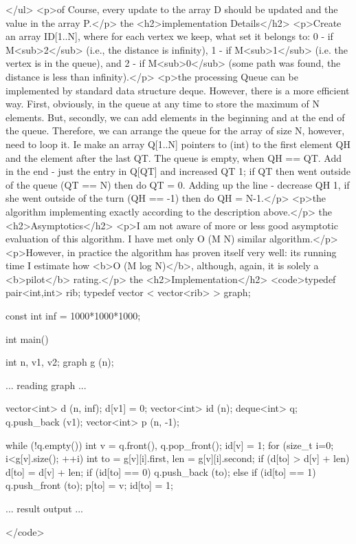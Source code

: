 </ul>
<p>of Course, every update to the array D should be updated and the value in the array P.</p>
the <h2>implementation Details</h2>
<p>Create an array ID[1..N], where for each vertex we keep, what set it belongs to: 0 - if M<sub>2</sub> (i.e., the distance is infinity), 1 - if M<sub>1</sub> (i.e. the vertex is in the queue), and 2 - if M<sub>0</sub> (some path was found, the distance is less than infinity).</p>
<p>the processing Queue can be implemented by standard data structure deque. However, there is a more efficient way. First, obviously, in the queue at any time to store the maximum of N elements. But, secondly, we can add elements in the beginning and at the end of the queue. Therefore, we can arrange the queue for the array of size N, however, need to loop it. Ie make an array Q[1..N] pointers to (int) to the first element QH and the element after the last QT. The queue is empty, when QH == QT. Add in the end - just the entry in Q[QT] and increased QT 1; if QT then went outside of the queue (QT == N) then do QT = 0. Adding up the line - decrease QH 1, if she went outside of the turn (QH == -1) then do QH = N-1.</p>
<p>the algorithm implementing exactly according to the description above.</p>
the <h2>Asymptotics</h2>
<p>I am not aware of more or less good asymptotic evaluation of this algorithm. I have met only O (M N) similar algorithm.</p>
<p>However, in practice the algorithm has proven itself very well: its running time I estimate how <b>O (M log N)</b>, although, again, it is solely a <b>pilot</b> rating.</p>
the <h2>Implementation</h2>
<code>typedef pair<int,int> rib;
typedef vector < vector<rib> > graph;

const int inf = 1000*1000*1000;


int main()
{
int n, v1, v2;
graph g (n);

... reading graph ...

vector<int> d (n, inf);
d[v1] = 0;
vector<int> id (n);
deque<int> q;
q.push_back (v1);
vector<int> p (n, -1);

while (!q.empty())
{
int v = q.front(), q.pop_front();
id[v] = 1;
for (size_t i=0; i<g[v].size(); ++i)
{
int to = g[v][i].first, len = g[v][i].second;
if (d[to] > d[v] + len)
{
d[to] = d[v] + len;
if (id[to] == 0)
q.push_back (to);
else if (id[to] == 1)
q.push_front (to);
p[to] = v;
id[to] = 1;
}
}
}

... result output ...

}</code>
